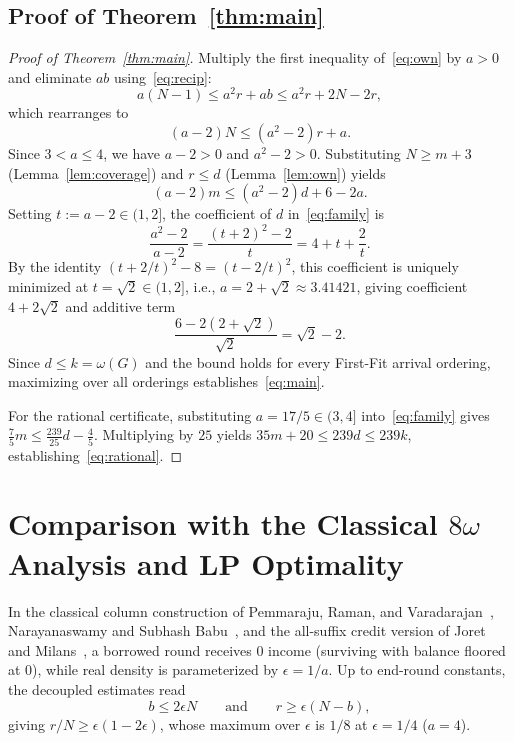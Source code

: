 \documentclass[11pt,a4paper]{article}
\theoremstyle{remark}
\begin{document}
\subsection{Proof of Theorem~\ref{thm:main}}

\begin{proof}[Proof of Theorem~\ref{thm:main}]
Multiply the first inequality of~\eqref{eq:own} by $a > 0$ and eliminate $ab$ using~\eqref{eq:recip}:
\[
  a(N - 1) \le a^2 r + ab \le a^2 r + 2N - 2r,
\]
which rearranges to
\[
  (a - 2)N \le (a^2 - 2)r + a.
\]
Since $3 < a \le 4$, we have $a - 2 > 0$ and $a^2 - 2 > 0$. Substituting $N \ge m + 3$ (Lemma~\ref{lem:coverage}) and $r \le d$ (Lemma~\ref{lem:own}) yields
\begin{equation}\label{eq:family}
  (a - 2)m \le (a^2 - 2)d + 6 - 2a.
\end{equation}
Setting $t := a - 2 \in (1, 2]$, the coefficient of $d$ in~\eqref{eq:family} is
\[
  \frac{a^2 - 2}{a - 2} = \frac{(t + 2)^2 - 2}{t} = 4 + t + \frac{2}{t}.
\]
By the identity $(t + 2/t)^2 - 8 = (t - 2/t)^2$, this coefficient is uniquely minimized at $t = \sqrt{2} \in (1, 2]$, i.e., $a = 2 + \sqrt{2} \approx 3.41421$, giving coefficient $4 + 2\sqrt{2}$ and additive term
\[
  \frac{6 - 2(2 + \sqrt{2})}{\sqrt{2}} = \sqrt{2} - 2.
\]
Since $d \le k = \omega(G)$ and the bound holds for every First-Fit arrival ordering, maximizing over all orderings establishes~\eqref{eq:main}.

For the rational certificate, substituting $a = 17/5 \in (3, 4]$ into~\eqref{eq:family} gives $\frac{7}{5}m \le \frac{239}{25}d - \frac{4}{5}$. Multiplying by $25$ yields $35m + 20 \le 239d \le 239k$, establishing~\eqref{eq:rational}.
\end{proof}

\section{Comparison with the Classical $8\omega$ Analysis and LP Optimality}

In the classical column construction of Pemmaraju, Raman, and Varadarajan~\cite{prv04}, Narayanaswamy and Subhash Babu~\cite{nsb08}, and the all-suffix credit version of Joret and Milans~\cite{jm11}, a borrowed round receives $0$ income (surviving with balance floored at $0$), while real density is parameterized by $\epsilon = 1/a$. Up to end-round constants, the decoupled estimates read
\[
  b \le 2\epsilon N \qquad\text{and}\qquad r \ge \epsilon(N - b),
\]
giving $r/N \ge \epsilon(1 - 2\epsilon)$, whose maximum over $\epsilon$ is $1/8$ at $\epsilon = 1/4$ ($a = 4$).
\end{document}
